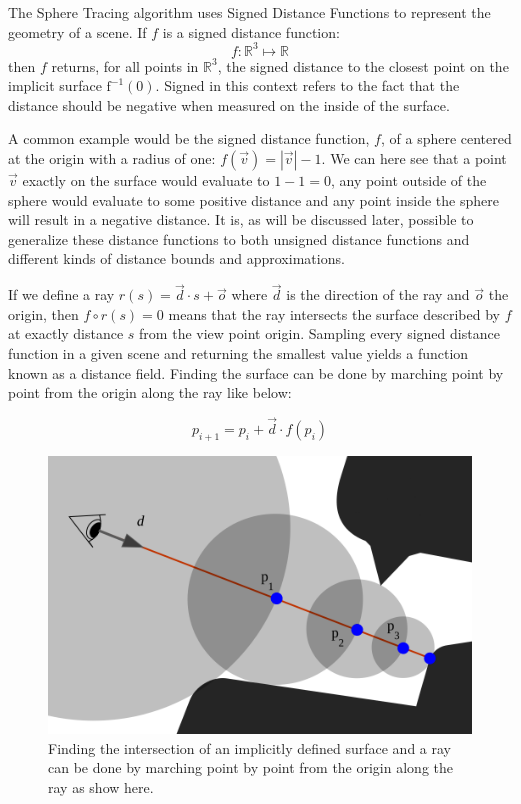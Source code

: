 		The Sphere Tracing algorithm uses Signed Distance Functions to
		represent the geometry of a scene. If $f$ is a signed distance
		function: $$f : \mathbb{R}^{3}\mapsto\mathbb{R}$$ then $f$ returns, for
		all points in $\mathbb{R}^3$, the signed distance to the closest point
		on the implicit surface $\text{f}^{-1}(0)$. Signed in this context
		refers to the fact that the distance should be negative when measured
		on the inside of the surface.

		A common example would be the signed distance function, $f$, of a
		sphere centered at the origin with a radius of one: $f(\vec{v}) =
		|\vec{v}| - 1$. We can here see that a point $\vec{v}$ exactly on the
		surface would evaluate to $1-1=0$, any point outside of the sphere
		would evaluate to some positive distance and any point inside the
		sphere will result in a negative distance. It is, as will be discussed
		later, possible to generalize these distance functions to both unsigned
		distance functions and different kinds of distance bounds and
		approximations.

		If we define a ray $r(s) = \vec{d} \cdot s + \vec{o}$ where $\vec{d}$
		is the direction of the ray and $\vec{o}$ the origin, then $f\circ r(s)
		= 0$ means that the ray intersects the surface described by $f$ at
		exactly distance $s$ from the view point origin. Sampling every signed
		distance function in a given scene and returning the smallest value
		yields a function known as a distance field. Finding the surface can be
		done by marching point by point from the origin along the ray like
		below: 
		
		$$p_{i+1} = p_i + \vec{d}\cdot f(p_i)$$ 
		
		\begin{figure}
			\centering
			\includegraphics[width=0.75\linewidth]{figure/SDF2}
			\caption{Finding the intersection of an implicitly defined surface
				and a ray can be done by marching point by point from the 
				origin along the ray as show here.}
		\end{figure}

